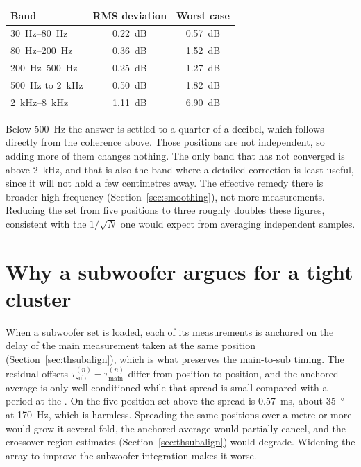 \begin{center}
\begin{tabular}{lcc}
\toprule
Band & RMS deviation & Worst case\\
\midrule
\SIrange{30}{80}{\hertz}       & \SI{0.22}{\dB} & \SI{0.57}{\dB}\\
\SIrange{80}{200}{\hertz}      & \SI{0.36}{\dB} & \SI{1.52}{\dB}\\
\SIrange{200}{500}{\hertz}     & \SI{0.25}{\dB} & \SI{1.27}{\dB}\\
\SI{500}{\hertz} to \SI{2}{\kilo\hertz}   & \SI{0.50}{\dB} & \SI{1.82}{\dB}\\
\SIrange{2}{8}{\kilo\hertz}    & \SI{1.11}{\dB} & \SI{6.90}{\dB}\\
\bottomrule
\end{tabular}
\end{center}

\noindent Below \SI{500}{\hertz} the answer is settled to a quarter of a decibel, which follows directly from the coherence above. Those positions are not independent, so adding more of them changes nothing. The only band that has not converged is above \SI{2}{\kilo\hertz}, and that is also the band where a detailed correction is least useful, since it will not hold a few centimetres away. The effective remedy there is broader high-frequency  (Section~\ref{sec:smoothing}), not more measurements. Reducing the set from five positions to three roughly doubles these figures, consistent with the $1/\sqrt N$ one would expect from averaging independent samples.

\section{Why a subwoofer argues for a tight cluster}\label{sec:subcluster}
When a subwoofer set is loaded, each of its measurements is anchored on the delay of the main measurement taken at the same position (Section~\ref{sec:thsubalign}), which is what preserves the main-to-sub timing. The residual offsets $\tau^{(n)}_\mathrm{sub} - \tau^{(n)}_\mathrm{main}$ differ from position to position, and the anchored average is only well conditioned while that spread is small compared with a period at the . On the five-position set above the spread is \SI{0.57}{\milli\second}, about \SI{35}{\degree} at \SI{170}{\hertz}, which is harmless. Spreading the same positions over a metre or more would grow it several-fold, the anchored average would partially cancel, and the crossover-region estimates (Section~\ref{sec:thsubalign}) would degrade. Widening the array to improve the subwoofer integration makes it worse.
